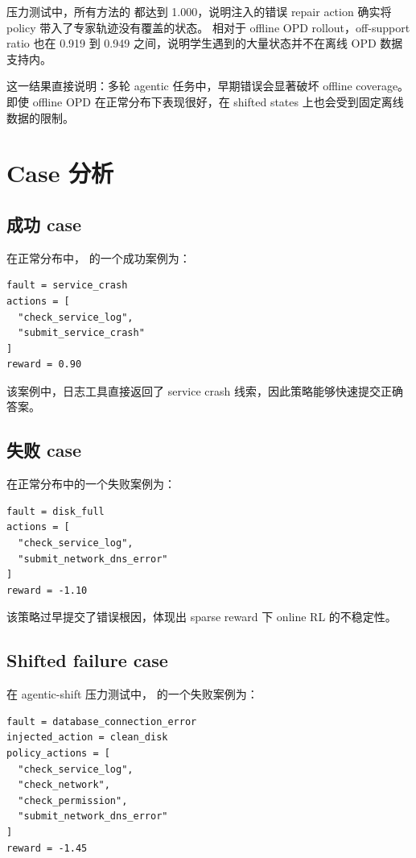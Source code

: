 \documentclass[11pt]{ctexart}
\begin{document}
压力测试中，所有方法的  都达到 1.000，说明注入的错误 repair action 确实将 policy 带入了专家轨迹没有覆盖的状态。
相对于 offline OPD rollout，off-support ratio 也在 0.919 到 0.949 之间，说明学生遇到的大量状态并不在离线 OPD 数据支持内。

这一结果直接说明：多轮 agentic 任务中，早期错误会显著破坏 offline coverage。
即使 offline OPD 在正常分布下表现很好，在 shifted states 上也会受到固定离线数据的限制。

\section{Case 分析}

\subsection{成功 case}

在正常分布中，\sft{} 的一个成功案例为：

\begin{lstlisting}
fault = service_crash
actions = [
  "check_service_log",
  "submit_service_crash"
]
reward = 0.90
\end{lstlisting}

该案例中，日志工具直接返回了 service crash 线索，因此策略能够快速提交正确答案。

\subsection{失败 case}

\onlinerl{} 在正常分布中的一个失败案例为：

\begin{lstlisting}
fault = disk_full
actions = [
  "check_service_log",
  "submit_network_dns_error"
]
reward = -1.10
\end{lstlisting}

该策略过早提交了错误根因，体现出 sparse reward 下 online RL 的不稳定性。

\subsection{Shifted failure case}

在 agentic-shift 压力测试中，\offlineopd{} 的一个失败案例为：

\begin{lstlisting}
fault = database_connection_error
injected_action = clean_disk
policy_actions = [
  "check_service_log",
  "check_network",
  "check_permission",
  "submit_network_dns_error"
]
reward = -1.45
\end{lstlisting}
\end{document}

